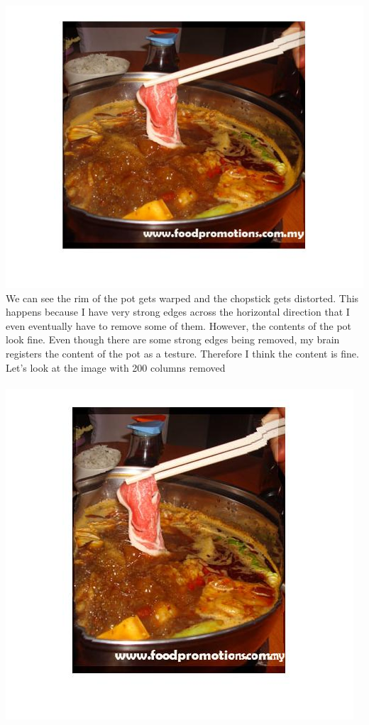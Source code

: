 \documentclass[english]{article}
\begin{document}
\includegraphics[scale=0.8]{carving/hotpot100removed.jpg}\\
We can see the rim of the pot gets warped and the chopstick gets distorted. This happens because I have very strong edges across the horizontal direction that I even eventually have to remove some of them. However, the contents of the pot look fine. Even though there are some strong edges being removed, my brain registers the content of the pot as a testure. Therefore I think the content is fine. Let's look at the image with 200 columns removed\\\\
\includegraphics[scale=0.8]{carving/hotpot200removed.jpg}\\
\end{document}
